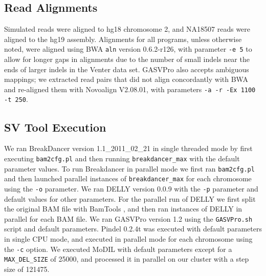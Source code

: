 \documentclass[11pt]{article}
\begin{document}
\subsection{Read Alignments}
Simulated reads were aligned to hg18 chromosome 2, and NA18507 reads were aligned to the hg19 assembly. Alignments for all programs, unless otherwise noted, were aligned using BWA \autocite{Li:2009p836} \texttt{aln} version 0.6.2-r126, with parameter \texttt{-e 5} to allow for longer gaps in alignments due to the number of small indels near the ends of larger indels in the Venter data set. GASVPro also accepts ambiguous mappings; we extracted read pairs that did not align concordantly with BWA and re-aligned them with Novoalign V2.08.01, with parameters \texttt{-a -r -Ex 1100 -t 250}. 

\subsection{SV Tool Execution}
We ran BreakDancer version 1.1\_2011\_02\_21 in single threaded mode by first executing \texttt{bam2cfg.pl} and then running \texttt{breakdancer\_max} with the default parameter values.  To run Breakdancer in parallel mode we first ran \texttt{bam2cfg.pl} and then launched parallel instances of \texttt{breakdancer\_max} for each chromosome using the \texttt{-o} parameter. We ran DELLY version 0.0.9 with the \texttt{-p} parameter and default values for other parameters. For the parallel run of DELLY we first split the original BAM file with BamTools \autocite{Barnett:2011hm}, and then ran instances of DELLY in parallel for each BAM file. We ran GASVPro version 1.2 using the \texttt{GASVPro.sh} script and default parameters. Pindel 0.2.4t was executed with default parameters in single CPU mode, and executed in parallel mode for each chromosome using the \texttt{-c} option. We executed MoDIL with default parameters except for a \texttt{MAX\_DEL\_SIZE} of 25000, and processed it in parallel on our cluster with a step size of 121475.
\end{document}
